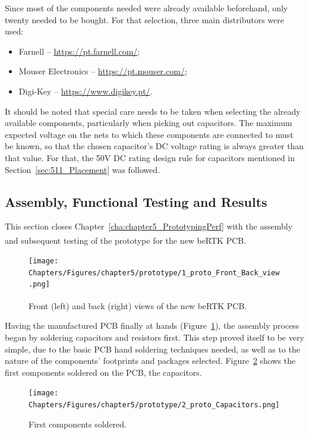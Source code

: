 Since most of the components needed were already available beforehand, only twenty needed to be bought. For that selection, three main distributors were used:
\begin{itemize}
	\item Farnell -- \url{https://pt.farnell.com/};
	\item Mouser Electronics -- \url{https://pt.mouser.com/};
	\item Digi-Key -- \url{https://www.digikey.pt/}.
\end{itemize}

It should be noted that special care needs to be taken when selecting the already available components, particularly when picking out capacitors. The maximum expected voltage on the nets to which these components are connected to must be known, so that the chosen capacitor's DC voltage rating is always greater than that value. For that, the 50V DC rating design rule for capacitors mentioned in Section~\ref{sec:511_Placement} was followed.


\subsection{Assembly, Functional Testing and Results}\label{sec:533_PrototypeAssembly}

This section closes Chapter~\ref{cha:chapter5_PrototypingPerf} with the assembly and subsequent testing of the prototype for the new beRTK\textsuperscript{\textregistered} PCB.

\begin{figure}[h]
	\centering
	\texttt{[image: Chapters/Figures/chapter5/prototype/1\_proto\_Front\_Back\_view.png]}
	\caption{Front (left) and back (right) views of the new beRTK\textsuperscript{\textregistered} PCB.}
	\label{fig:1_proto_Front_Back_view}
\end{figure}%

Having the manufactured PCB finally at hands (Figure~\ref{fig:1_proto_Front_Back_view}), the assembly process began by soldering capacitors and resistors first. This step proved itself to be very simple, due to the basic PCB hand soldering techniques needed, as well as to the nature of the components' footprints and packages selected. Figure~\ref{fig:2_proto_Capacitors} shows the first components soldered on the PCB, the capacitors.

\begin{figure}[h]
	\centering
	\texttt{[image: Chapters/Figures/chapter5/prototype/2\_proto\_Capacitors.png]}
	\caption{First components soldered.}
	\label{fig:2_proto_Capacitors}
\end{figure}%

